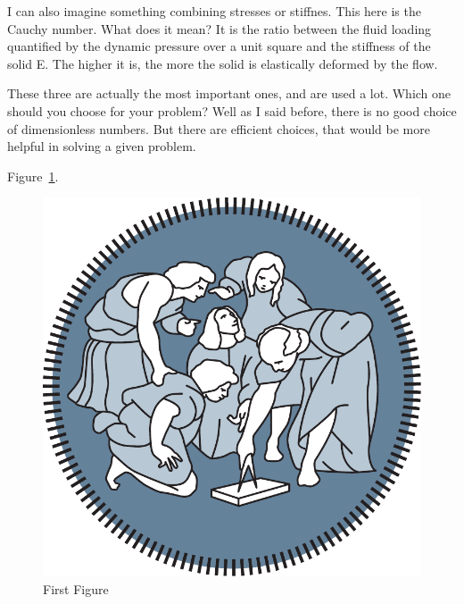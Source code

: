  I can also imagine something
combining stresses or stiffnes. This here is the Cauchy number. What does it mean? It is the ratio between the fluid loading
quantified by the dynamic pressure over a  unit square and
the stiffness of the solid E. 
The higher it is, the more the solid
is elastically deformed by the flow.


 These three are actually the most
important ones, and are used a lot. Which one should you choose for
your problem? Well as I said before, there is no
good choice of dimensionless numbers. But there are efficient choices, that would be more helpful
in solving a given problem. 



Figure~\ref{fig:first_figure}.
\begin{figure}[htbp!]
\centering
\includegraphics[height=0.24\textheight]{images/logo_poli}
\caption{First Figure}
\label{fig:first_figure}
\end{figure}
\\
